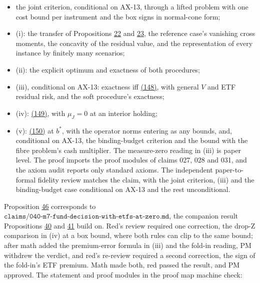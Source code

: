 \documentclass[11pt]{article}
\begin{document}
\begin{itemize}
  \item the joint criterion, conditional on AX-13, through a lifted problem
  with one cost bound per instrument and the box signs in normal-cone
  form;
  \item (i): the transfer of Propositions \hyperref[res:Proposition-22]{22} and \hyperref[res:Proposition-23]{23}, the reference case's
  vanishing cross moments, the concavity of the residual value, and
  the representation of every instance by finitely many scenarios;
  \item (ii): the explicit optimum and exactness of both procedures;
  \item (iii), conditional on AX-13: exactness iff \hyperref[eq:148]{(148)}, with general \(V\)
  and ETF residual risk, and the soft procedure's exactness;
  \item (iv): \hyperref[eq:149]{(149)}, with \(\mu_J=0\) at an interior holding;
  \item (v): \hyperref[eq:150]{(150)} at \(b^*\), with the operator norms entering as any bounds,
  and, conditional on AX-13, the binding-budget criterion and the bound
  with the fibre problem's cash multiplier.
The measure-zero reading in (iii) is paper level. The proof imports the
proof modules of claims 027, 028 and 031, and the axiom audit reports
only standard axioms. The independent paper-to-formal fidelity review
matches the claim, with the joint criterion, (iii) and the
binding-budget case conditional on AX-13 and the rest unconditional.
\end{itemize}

Proposition \hyperref[res:Proposition-46]{46} corresponds to
\(\texttt{claims/040-m7-fund-decision-with-etfs-at-zero.md}\), the companion
result Propositions \hyperref[res:Proposition-40]{40} and \hyperref[res:Proposition-41]{41} build on. Red's review required one
correction, the drop-Z comparison in (iv) at a box bound, where both
rules can clip to the same bound; after math added the premium-error
formula in (iii) and the fold-in reading, PM withdrew the verdict, and
red's re-review required a second correction, the sign of the fold-in's
ETF premium. Math made both, red passed the result, and PM approved.
The statement and proof modules in the proof map machine check:
\end{document}
